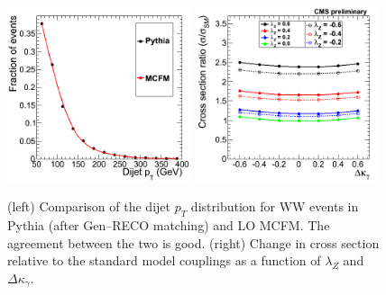 \begin{figure}[h!t]
  {\centering
    \includegraphics[width=0.48\textwidth]{figs/Pythia_mcfm_dijetpt.png}
    \includegraphics[width=0.48\textwidth]{figs/atgc_xsec2.png}
    \caption{(left) Comparison of the dijet $p_T$ distribution for WW events in Pythia 
    (after Gen--RECO matching) and LO MCFM. The agreement between the two is good.
    (right) Change in cross section relative to the standard model couplings 
    as a function of $\lambda_Z$ and $\Delta{\kappa_\gamma}$.
    }
    \label{fig:ww_dijetPt_PythiaMCFM_comparison}}
\end{figure}

